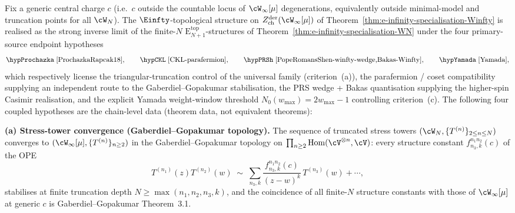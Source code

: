\begin{theorem}
\label{thm:w-infty-e-infty-topological-convergence}
\label{conj:w-infty-e-infty-topological-convergence}%
Fix a generic central charge $c$ (i.e.\ $c$ outside the countable
locus of $\cW_\infty[\mu]$ degenerations, equivalently outside
minimal-model and truncation points for all $\cW_N$). The
$\Einfty$-topological structure on
$Z^{\mathrm{der}}_{\mathrm{ch}}(\cW_\infty[\mu])$ of
Theorem~\textup{\ref{thm:e-infinity-specialisation-Winfty}} is realised
as the strong inverse limit of the finite-$N$
$\mathrm{E}_{N+1}^{\mathrm{top}}$-structures of
Theorem~\textup{\ref{thm:e-infinity-specialisation-WN}} under the
four primary-source endpoint hypotheses
\[
 \hypProchazka\;\text{\cite{ProchazkaRapcak18}},\qquad
 \hypCKL\;\text{\cite{CKL-parafermion}},\qquad
 \hypPRSh\;\text{\cite{PopeRomansShen-winfty-wedge,Bakas-Winfty}},\qquad
 \hypYamada\;\text{\cite{Yamada}},
\]
which respectively license the
triangular-truncation control of the universal family
(criterion~(a)), the parafermion / coset compatibility supplying an
independent route to the Gaberdiel--Gopakumar stabilisation, the
PRS wedge + Bakas quantisation supplying the higher-spin Casimir
realisation, and the explicit Yamada weight-window threshold
$N_0(w_{\max}) = 2 w_{\max} - 1$ controlling criterion~(c). The
following four coupled hypotheses are the chain-level data
(theorem data, not equivalent theorems):

\smallskip
\textbf{(a) Stress-tower convergence
(Gaberdiel--Gopakumar topology).}
The sequence of truncated stress towers
$(\cW_N, \{T^{(n)}\}_{2 \le n \le N})$ converges to
$(\cW_\infty[\mu], \{T^{(n)}\}_{n \ge 2})$ in the
Gaberdiel--Gopakumar topology on
$\prod_{n \ge 2} \mathrm{Hom}(\cV^{\otimes n}, \cV)$: every
structure constant $f^{n_1 n_2}_{n_3,k}(c)$ of the OPE
\begin{equation}\label{eq:winfty-ope-structure-constants}
T^{(n_1)}(z) T^{(n_2)}(w) \;\sim\; \sum_{n_3,k}
\frac{f^{n_1 n_2}_{n_3,k}(c)}{(z-w)^k}\, T^{(n_3)}(w) + \cdots,
\end{equation}
stabilises at finite truncation depth $N \ge \max(n_1,n_2,n_3,k)$, and
the coincidence of all finite-$N$ structure constants with those of
$\cW_\infty[\mu]$ at generic $c$ is Gaberdiel--Gopakumar\,\cite{%
GaberdielGopakumar2011-Winfty}\,Theorem~3.1.


\end{theorem}
